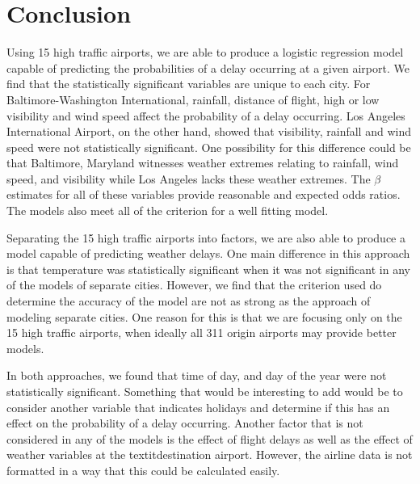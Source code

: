 \documentclass{asaproc}
\begin{document}
\section{Conclusion}
Using 15 high traffic airports, we are able to produce a logistic regression model capable of predicting the probabilities of a delay occurring at a given airport. We find that the statistically significant variables are unique to each city. For Baltimore-Washington International, rainfall, distance of flight, high or low visibility and wind speed affect the probability of a delay occurring. Los Angeles International Airport, on the other hand, showed that visibility, rainfall and wind speed were not statistically significant. One possibility for this difference could be that Baltimore, Maryland witnesses weather extremes relating to rainfall, wind speed, and visibility while Los Angeles lacks these weather extremes. The $\beta$ estimates for all of these variables provide reasonable and expected odds ratios. The models also meet all of the criterion for a well fitting model.

Separating the 15 high traffic airports into factors, we are also able to produce a model capable of predicting weather delays. One main difference in this approach is that temperature was statistically significant when it was not significant in any of the models of separate cities. However, we find that the criterion used do determine the accuracy of the model are not as strong as the approach of modeling separate cities. One reason for this is that we are focusing only on the 15 high traffic airports, when ideally all 311 origin airports may provide better models.

In both approaches, we found that time of day, and day of the year were not statistically significant. Something that would be interesting to add would be to consider another variable that indicates holidays and determine if this has an effect on the probability of a delay occurring. Another factor that is not considered in any of the models is the effect of flight delays as well as the effect of weather variables at the textit{destination} airport. However, the airline data is not formatted in a way that this could be calculated easily. 








\end{document}
